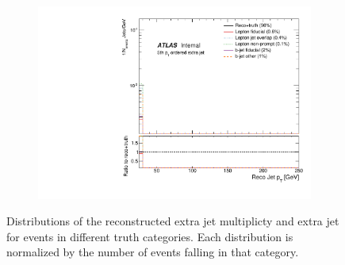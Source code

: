 \begin{figure}
\begin{subfigure}[]{0.3\textwidth}
\end{subfigure}
~
\begin{subfigure}[]{0.3\textwidth}
\includegraphics[width=\textwidth]{fig/RecoNotTruth/RecoPtJet4.pdf}
\end{subfigure}

\caption{Distributions of the reconstructed extra jet multiplicty and extra jet \pt for events in different truth categories. Each distribution is normalized by the number of events falling in that category. }
\label{fig:fakejetpt}

\end{figure}

\clearpage

